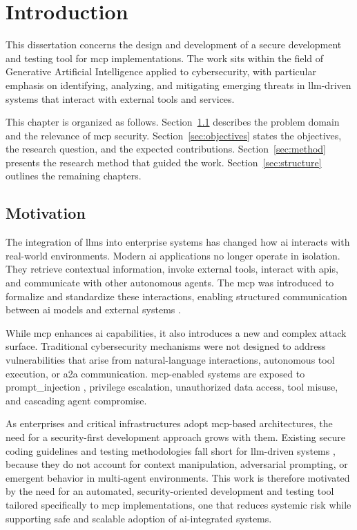 \chapter{Introduction}
This dissertation concerns the design and development of a secure development and testing tool for \gls{mcp} implementations. The work sits within the field of Generative Artificial Intelligence applied to cybersecurity, with particular emphasis on identifying, analyzing, and mitigating emerging threats in \gls{llm}-driven systems that interact with external tools and services.

This chapter is organized as follows. Section~\ref{sec:motivation} describes the problem domain and the relevance of \gls{mcp} security. Section~\ref{sec:objectives} states the objectives, the research question, and the expected contributions. Section~\ref{sec:method} presents the research method that guided the work. Section~\ref{sec:structure} outlines the remaining chapters.

\section{Motivation}
\label{sec:motivation}

The integration of \glspl{llm} into enterprise systems has changed how \gls{ai} interacts with real-world environments. Modern \gls{ai} applications no longer operate in isolation. They retrieve contextual information, invoke external tools, interact with \glspl{api}, and communicate with other autonomous agents. The \gls{mcp} was introduced to formalize and standardize these interactions, enabling structured communication between \gls{ai} models and external systems \citep{anthropic2024mcp}.

While \gls{mcp} enhances \gls{ai} capabilities, it also introduces a new and complex attack surface. Traditional cybersecurity mechanisms were not designed to address vulnerabilities that arise from natural-language interactions, autonomous tool execution, or \gls{a2a} communication. \gls{mcp}-enabled systems are exposed to \gls{prompt_injection} \citep{greshake2023prompt, liu2024universal}, privilege escalation, unauthorized data access, tool misuse, and cascading agent compromise.

As enterprises and critical infrastructures adopt \gls{mcp}-based architectures, the need for a security-first development approach grows with them. Existing secure coding guidelines and testing methodologies fall short for \gls{llm}-driven systems \citep{owasp2024llm}, because they do not account for context manipulation, adversarial prompting, or emergent behavior in multi-agent environments. This work is therefore motivated by the need for an automated, security-oriented development and testing tool tailored specifically to \gls{mcp} implementations, one that reduces systemic risk while supporting safe and scalable adoption of \gls{ai}-integrated systems.

